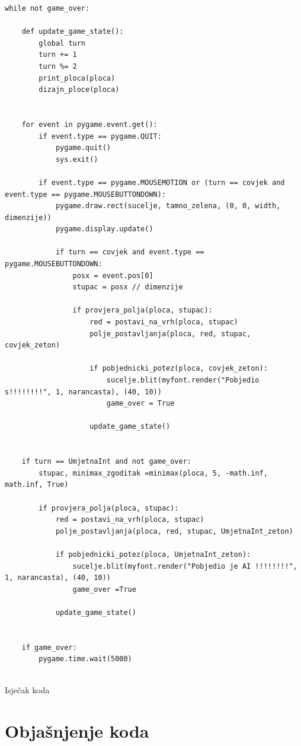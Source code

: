 \documentclass[]{foi}
\begin{document}
\begin{listing}
    \begin{verbatim}
while not game_over:
    
    def update_game_state():
        global turn
        turn += 1
        turn %= 2
        print_ploca(ploca)
        dizajn_ploce(ploca)

     
    for event in pygame.event.get():
        if event.type == pygame.QUIT:
            pygame.quit()
            sys.exit()

        if event.type == pygame.MOUSEMOTION or (turn == covjek and event.type == pygame.MOUSEBUTTONDOWN):
            pygame.draw.rect(sucelje, tamno_zelena, (0, 0, width, dimenzije))
            pygame.display.update()

            if turn == covjek and event.type == pygame.MOUSEBUTTONDOWN:
                posx = event.pos[0]
                stupac = posx // dimenzije

                if provjera_polja(ploca, stupac):
                    red = postavi_na_vrh(ploca, stupac)
                    polje_postavljanja(ploca, red, stupac, covjek_zeton)

                    if pobjednicki_potez(ploca, covjek_zeton):
                        sucelje.blit(myfont.render("Pobjedio s!!!!!!!!", 1, narancasta), (40, 10))
                        game_over = True

                    update_game_state()


    if turn == UmjetnaInt and not game_over:
        stupac, minimax_zgoditak =minimax(ploca, 5, -math.inf, math.inf, True)

        if provjera_polja(ploca, stupac):
            red = postavi_na_vrh(ploca, stupac)
            polje_postavljanja(ploca, red, stupac, UmjetnaInt_zeton)

            if pobjednicki_potez(ploca, UmjetnaInt_zeton):
                sucelje.blit(myfont.render("Pobjedio je AI !!!!!!!!", 1, narancasta), (40, 10))
                game_over =True

            update_game_state()


    if game_over:
        pygame.time.wait(5000)
    
    \end{verbatim}
    \caption{Isječak koda}
    \label{lst:dva}
\end{listing}


\chapter{Objašnjenje koda}
\end{document}
